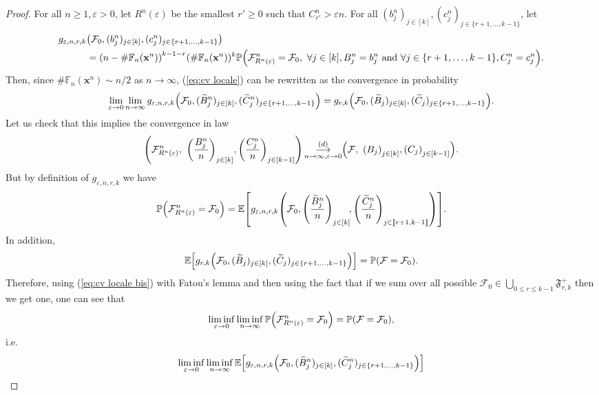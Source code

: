 \documentclass[11pt]{article}
\theoremstyle{plain}
\theoremstyle{definition}
\theoremstyle{remark}
\renewcommand{\P}{{\mathbb{P}}} %
\newcommand{\E}{\mathbb{E}} %
\newcommand{\1}{\mathbbm{1}} %
\newcommand{\esp}[1]{\mathbb{E}\left[#1\right]} %
\newcommand{\proba}[1]{\mathbb{P}\left(#1\right)} %
\newcommand{\e}{\varepsilon} %
\newcommand{\Xb}{\mathrm{\mathbf{x}}} %
\let\originalleft\left
\let\originalright\right
\renewcommand{\left}{\mathopen{}\mathclose\bgroup\originalleft}
\renewcommand{\right}{\aftergroup\egroup\originalright}
\begin{document}
\begin{proof}
For all $n\ge 1, \e>0$, let $R^n(\e)$ be the smallest $r'\ge 0$ such that $C^n_{r'}> \e n $. For all $(b^n_j)_{j\in [k]}, (c^n_j)_{j \in \{r+1,\ldots, k-1 \}}$, let
\begin{align*}
g_{\e,n,r,k}&\left(\mathcal{F}_0, (b^n_j)_{j\in [k]}, (c^n_j)_{j \in \{r+1,\ldots, k-1 \}}\right) \\
&=\left(n-\#\mathbb{F}_n({\Xb}^n)\right)^{k-1-r}(\# \mathbb{F}_n(\Xb^n))^{k} \P\left( \mathcal{F}^n_{R^n(\e)}=\mathcal{F}_0, \  \forall j \in [k],  B^n_j=b_j^n \text{ and } \forall j \in \{r+1,\ldots,k-1\},  C^n_j=c_j^n  \right).
\end{align*} 
Then, since $\#\mathbb{F}_n({\Xb}^n) \sim n/2$ as $n \rightarrow \infty$, (\ref{eq:cv locale}) can be rewritten as the convergence in probability
\begin{equation}\label{eq:cv locale bis}
\lim_{\e \to 0}\lim_{n\to \infty} g_{\e,n,r,k}\left(\mathcal{F}_0, (\widetilde{B}^n_j)_{j\in [k]}, (\widetilde{C}^n_j)_{j \in \{r+1,\ldots, k-1 \}}\right) 
=
 g_{r,k}\left(\mathcal{F}_0, (\widetilde{B}_j)_{j\in [k]}, (\widetilde{C}_j)_{j \in \{r+1,\ldots, k-1 \}}\right).
\end{equation}
Let us check that this implies the convergence in law
\begin{equation}\label{eq:cv loi foret et temps}
\left( \mathcal{F}^n_{R^n(\e)}, \  \left(\frac{B^n_j}{n}\right)_{j \in [k]},  \left(\frac{C^n_j}{n}\right)_{j \in [k-1]} \right)
\mathop{\longrightarrow}\limits_{n\to \infty, \e \to 0}^{(d)}
\left( \mathcal{F}, \  \left(B_j\right)_{j \in [k]},  \left(C_j\right)_{j \in [k-1]} \right).
\end{equation}
But by definition of $g_{\e,n,r,k}$ we have
$$
	\P\left( \mathcal{F}^n_{R^n(\e)}=\mathcal{F}_0 \right) =   
	 \E\left[
	g_{\e, n, r, k}\left(\mathcal{F}_0, \left(\frac{\widetilde{B}^n_j}{n}\right)_{j \in [k]} \! , \left(\frac{\widetilde{C}^n_j}{n}\right)_{j \in \llbracket r+1, k-1 \rrbracket}
	\right)
	\right].
$$
In addition,
\[
\E\left[ g_{r,k}\left(\mathcal{F}_0, (\widetilde{B}_j)_{j\in [k]}, (\widetilde{C}_j)_{j \in \{r+1,\ldots, k-1 \}}\right) \right]= \P\left( \mathcal{F}=\mathcal{F}_0 \right).
\]
Therefore, using (\ref{eq:cv locale bis}) with Fatou's lemma and then using the fact that if we sum over all possible $\mathcal{F}_0 \in \bigcup_{0\le r \le k-1} \mathfrak{F}^+_{r,k}$ then we get one,  one can see that
\[
\liminf_{\e \to 0} \liminf_{n \to \infty} \P\left( \mathcal{F}^n_{R^n(\e)}=\mathcal{F}_0 \right) 
= \P\left( \mathcal{F}=\mathcal{F}_0 \right),
\]
i.e.
\[
\liminf_{\e \to 0} \liminf_{n \to \infty} \E \left[g_{\e,n,r,k}\left(\mathcal{F}_0, (\widetilde{B}^n_j)_{j\in [k]}, (\widetilde{C}^n_j)_{j \in \{r+1,\ldots, k-1 \}}\right) \right]
\]
\end{proof}
\end{document}
